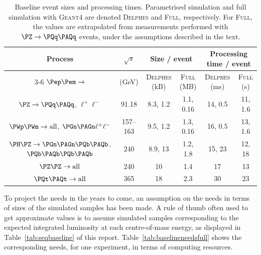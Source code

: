 \begin{table}[ht]
\centering
\caption{Baseline event sizes and processing times. Parametrised simulation and full simulation with \textsc{Geant4} are denoted  
\textsc{Delphes} and \textsc{Full}, respectively. For \textsc{Full}, the values are extrapolated from measurements performed with $\PZ \to \PQq\PAQq$ events, under the assumptions described in the text. }
\label{tab:baselinesizes}
\begin{tabular}{c c c c c c }
\toprule
Process & $\sqrt{s}$ & \multicolumn{2}{c}{Size / event } & \multicolumn{2}{c}{Processing time / event }  \\ \cline{3-6}
$\epem \to$ & (GeV) & \textsc{Delphes} (kB) & \textsc{Full} (MB) & \textsc{Delphes} (ms) & \textsc{Full} (s) \\ 
\midrule
$\PZ \to \PQq\PAQq$, $\ell^+\ell^-$ & 91.18 & 8.3, 1.2 & 1.1, 0.16      & 14, 0.5 & 11, 1.6 \\
$\PWp\PWm \to \text{all}$, $\PGn\PAGn \ell^+\ell^-$ & 157--163 & 9.5, 1.2 & 1.3, 0.16 & 16, 0.5 & 13, 1.6 \\
$\PH\PZ \to \PGn\PAGn \PQb\PAQb$, $\PQb\PAQb \PQb\PAQb$ & 240 & 8.9, 13 & 1.2, 1.8    & 15, 23 & 12, 18 \\
$\PZ\PZ \to \text{all}$ & 240 & 10 & 1.4                              & 17 & 13 \\
$\ttbar \to \text{all}$ & 365 & 18 & 2.3                           & 30 & 23 \\ 
\bottomrule
\end{tabular}
\end{table}

To project the needs in the years to come, 
an assumption on the needs in terms of sizes of the simulated samples has been made. 
A rule of thumb often used to get approximate values is to assume simulated samples corresponding to the expected integrated luminosity at each centre-of-mass energy, 
as displayed in Table~\ref{tab:seqbaseline} of this report. 
Table~\ref{tab:baselineneedsfull} shows the corresponding needs, for one experiment, in terms of computing resources.

